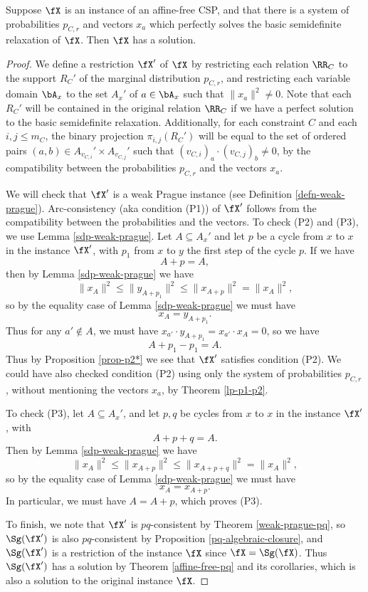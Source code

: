 \begin{thm} Suppose $\fX$ is an instance of an affine-free CSP, and that there is a system of probabilities $p_{C,r}$ and vectors $x_a$ which perfectly solves the basic semidefinite relaxation of $\fX$. Then $\fX$ has a solution.
\end{thm}
\begin{proof} We define a restriction $\fX'$ of $\fX$ by restricting each relation $\RR_C$ to the support $R_C'$ of the marginal distribution $p_{C,r}$, and restricting each variable domain $\bA_x$ to the set $A_x'$ of $a \in \bA_x$ such that $\|x_a\|^2 \ne 0$. Note that each $R_C'$ will be contained in the original relation $\RR_C$ if we have a perfect solution to the basic semidefinite relaxation. Additionally, for each constraint $C$ and each $i,j \le m_C$, the binary projection $\pi_{i,j}(R_C')$ will be equal to the set of ordered pairs $(a,b) \in A_{v_{C,i}}' \times A_{v_{C,j}}'$ such that $(v_{C,i})_a \cdot (v_{C,j})_b \ne 0$, by the compatibility between the probabilities $p_{C,r}$ and the vectors $x_a$.

We will check that $\fX'$ is a weak Prague instance (see Definition \ref{defn-weak-prague}). Arc-consistency (aka condition (P1)) of $\fX'$ follows from the compatibility between the probabilities and the vectors. To check (P2) and (P3), we use Lemma \ref{sdp-weak-prague}. Let $A \subseteq A_x'$ and let $p$ be a cycle from $x$ to $x$ in the instance $\fX'$, with $p_1$ from $x$ to $y$ the first step of the cycle $p$. If we have
\[
A+p = A,
\]
then by Lemma \ref{sdp-weak-prague} we have
\[
\|x_A\|^2 \le \|y_{A+p_1}\|^2 \le \|x_{A+p}\|^2 = \|x_A\|^2,
\]
so by the equality case of Lemma \ref{sdp-weak-prague} we must have
\[
x_A = y_{A+p_1}.
\]
Thus for any $a' \not\in A$, we must have $x_{a'} \cdot y_{A+p_1} = x_{a'} \cdot x_A = 0$, so we have
\[
A+p_1-p_1 = A.
\]
Thus by Proposition \ref{prop-p2*} we see that $\fX'$ satisfies condition (P2). We could have also checked condition (P2) using only the system of probabilities $p_{C,r}$, without mentioning the vectors $x_a$, by Theorem \ref{lp-p1-p2}.

To check (P3), let $A \subseteq A_x'$, and let $p,q$ be cycles from $x$ to $x$ in the instance $\fX'$, with
\[
A+p+q = A.
\]
Then by Lemma \ref{sdp-weak-prague} we have
\[
\|x_A\|^2 \le \|x_{A+p}\|^2 \le \|x_{A+p+q}\|^2 = \|x_A\|^2,
\]
so by the equality case of Lemma \ref{sdp-weak-prague} we must have
\[
x_A = x_{A+p}.
\]
In particular, we must have $A = A+p$, which proves (P3).

To finish, we note that $\fX'$ is $pq$-consistent by Theorem \ref{weak-prague-pq}, so $\Sg(\fX')$ is also $pq$-consistent by Proposition \ref{pq-algebraic-closure}, and $\Sg(\fX')$ is a restriction of the instance $\fX$ since $\fX = \Sg(\fX)$. Thus $\Sg(\fX')$ has a solution by Theorem \ref{affine-free-pq} and its corollaries, which is also a solution to the original instance $\fX$.
\end{proof}


